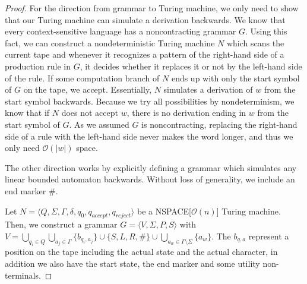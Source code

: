 \begin{proof}

    For the direction from grammar to Turing machine, we only need to show that our Turing machine can simulate a derivation backwards.
    We know that every context-sensitive language has a noncontracting grammar $G$.
    Using this fact, we can construct a nondeterministic Turing machine $N$ which scans the current tape and whenever it recognizes a pattern of the right-hand side of a production rule in $G$, it decides whether it replaces it or not by the left-hand side of the rule.
    If some computation branch of $N$ ends up with only the start symbol of $G$ on the tape, we accept.
    Essentially, $N$ simulates a derivation of $w$ from the start symbol backwards.
    Because we try all possibilities by nondeterminism, we know that if $N$ does not accept $w$, there is no derivation ending in $w$ from the start symbol of $G$.
    As we assumed $G$ is noncontracting, replacing the right-hand side of a rule with the left-hand side never makes the word longer, and thus we only need $\mathcal{O}(|w|)$ space.

    \vspace{5mm}

    The other direction works by explicitly defining a grammar which simulates any linear bounded automaton backwards.
    Without loss of generality, we include an end marker $\#$.

    Let $N = \langle Q, \Sigma, \Gamma, \delta, q_0, q_{accept}, q_{reject} \rangle$ be a NSPACE[$\mathcal{O}(n)$] Turing machine.
    Then, we construct a grammar $G = \langle V, \Sigma, P, S \rangle$ with $V = \bigcup_{q_i \in Q} \bigcup_{a_j \in \Gamma} \{b_{q_i, a_j}\} \cup \{S, L, R, \#\} \cup \bigcup_{a_w \in \Gamma \setminus \Sigma} \{a_w\}$.
    The $b_{q, a}$ represent a position on the tape including the actual state and the actual character, in addition we also have the start state, the end marker and some utility non-terminals.


\end{proof}
